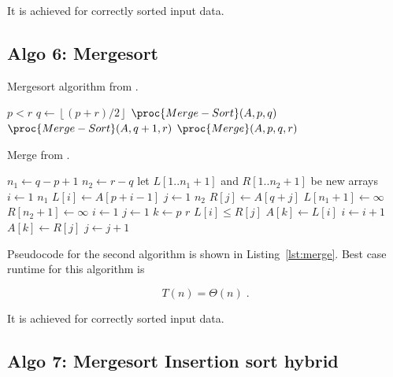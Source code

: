 \documentclass[twocolumn, sigconf, nonacm, natbib, screen, balance=False]{acmart}
\begin{document}
It is achieved for correctly sorted input data.

\subsection{Algo 6: Mergesort}\label{sec:algo6}

\begin{listing}[H]
  \caption{Mergesort algorithm from \citet[Ch.~2.1]{CLRS_2009}.}
  \label{lst:mergesort_algo}
  \begin{codebox}
	\li \If $p < r$
	\li \Then $q \gets \left\lfloor(p + r) / 2\right\rfloor$
	\li 	$\proc{Merge-Sort}(A, p, q)$
	\li 	$\proc{Merge-Sort}(A, q+1, r)$
	\li 	$\proc{Merge}(A, p, q, r)$
	\End
  \end{codebox}
\end{listing}

\begin{listing}[H]
  \caption{Merge from \citet[Ch.~2.1]{CLRS_2009}.}
  \label{lst:merge}
  \begin{codebox}
	\li $n_1 \gets q-p+1$
	\li $n_2 \gets r-q$
	\li let $L[1..n_1+1]$ and $R[1..n_2+1]$ be new arrays
	\li \For $i \gets 1$ \To $n_1$
	\li \Do $L[i] \gets A[p+i-1]$
	\End
	\li \For $j \gets 1$ \To $n_2$
	\li \Do $R[j] \gets A[q+j]$
	\End
	\li $L[n_1+1] \gets \infty$
	\li $R[n_2+1] \gets \infty$
	\li $i \gets 1$
	\li $j \gets 1$
	\li \For $k \gets p$ \To $r$
	\li \Do \If $L[i] \le R[j]$
	\li 	\Then $A[k] \gets L[i]$
	\li 		$i \gets i+1$
	\li 	\Else $A[k] \gets R[j]$
	\li 	$j \gets j+1$
	\End
	\End
  \end{codebox}
\end{listing}

Pseudocode for the second algorithm is shown in
Listing~\ref{lst:merge}. Best case runtime for this algorithm
is

\begin{equation}
  T(n) = \Theta(n) \;.  \label{eq:ins_sort_best}
\end{equation}

It is achieved for correctly sorted input data.

\subsection{Algo 7: Mergesort Insertion sort hybrid}\label{sec:algo7}
\end{document}
